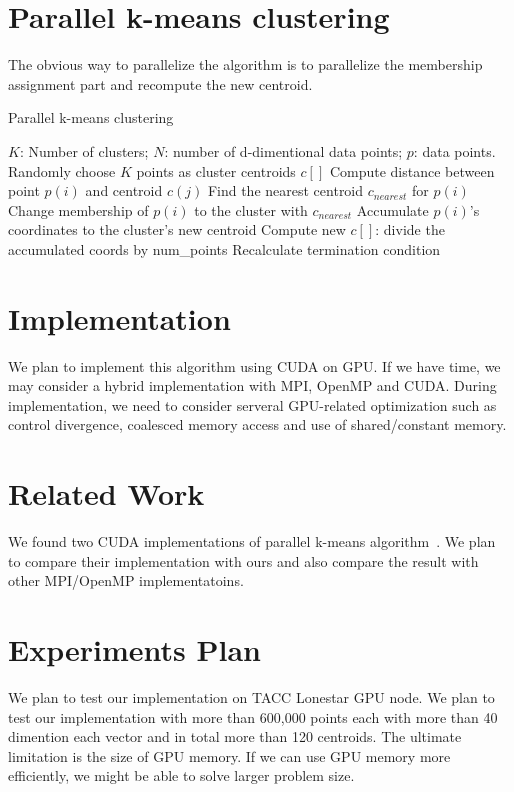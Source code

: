 \documentclass{article}
\begin{document}
\section{Parallel k-means clustering}
The obvious way to parallelize the algorithm is to parallelize the
membership assignment part and recompute the new centroid. 
\begin{algorithm}
  \caption{Parallel k-means clustering} \label{par}
  \begin{algorithmic}[1]
    \INPUT $K$: Number of clusters; $N$: number of d-dimentional data points; $p$: data points.
     \label{alg:p}
    \State Randomly choose $K$ points as cluster centroids $c[]$
    \State Compute distance between point $p(i)$ and centroid $c(j)$
    \EndFor
    \State Find the nearest centroid $c_{nearest}$ for $p(i)$
    \State Change membership of $p(i)$ to the cluster with $c_{nearest}$
    \State Accumulate $p(i)$'s coordinates to the cluster's new centroid
    \EndParFor
    \State Compute new $c[]$: divide the accumulated coords by num\_points
    \State Recalculate termination condition
    \EndWhile
    \EndFunction  
  \end{algorithmic}
\end{algorithm}

\section{Implementation}
We plan to implement this algorithm using CUDA on GPU. If we have
time, we may consider a hybrid implementation with MPI, OpenMP
and CUDA. During implementation, we need to consider serveral
GPU-related optimization such as control divergence, coalesced memory
access and use of shared/constant memory.  

\section{Related Work}
We found two CUDA implementations of parallel k-means
algorithm~\cite{serban-kmeans, gpuminer}. We plan to compare their
implementation with ours and also compare the result with other
MPI/OpenMP implementatoins.  

\section{Experiments Plan}
We plan to test our implementation on TACC Lonestar GPU node. We plan
to test our implementation with more than 600,000 points each with more
than 40 dimention each vector and in total more than 120 centroids. The
ultimate limitation is the size of GPU memory. If
we can use GPU memory more efficiently, we might be able to solve
larger problem size. 
\end{document}
